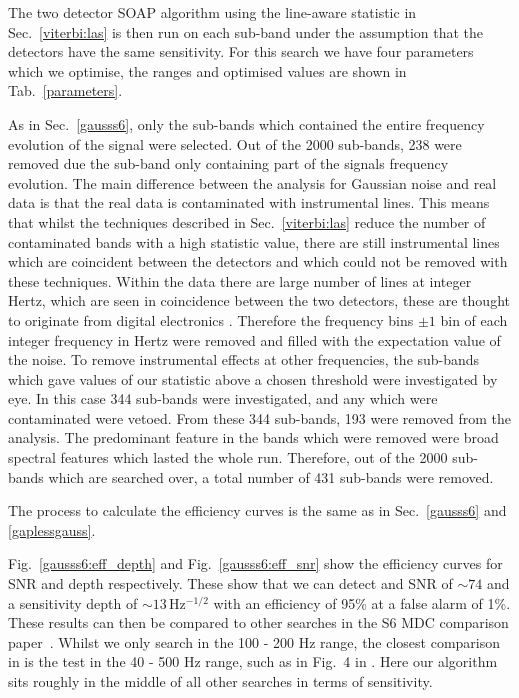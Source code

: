 The two detector SOAP algorithm using the line-aware statistic in Sec.~\ref{viterbi:las} is then run on each sub-band under the assumption that the detectors have the same sensitivity.
For this search we have four parameters which we optimise, the ranges and optimised values are shown in Tab.~\ref{parameters}.

%
%
As in Sec.~\ref{gausss6}, only the sub-bands which contained the entire frequency evolution of the signal were selected.
Out of the 2000 sub-bands, 238 were removed due the sub-band only containing part of the signals frequency evolution.
The main difference between the analysis for Gaussian noise and real data is that
the real data is contaminated with instrumental lines. This means that whilst the techniques described in Sec.~\ref{viterbi:las} reduce the number of contaminated bands with a high statistic value, there are still
instrumental lines which are coincident between the detectors and which could not be removed
with these techniques. Within the data there are large number of lines at integer Hertz, which are seen in coincidence between the two detectors, these are thought to originate from digital electronics \citep{coughlin2010NoiseLine}. Therefore the frequency bins $\pm1$ bin of each integer frequency in
Hertz were removed and filled with the expectation value of the noise. To remove instrumental effects at other frequencies,
the sub-bands which gave values of our
statistic above a chosen threshold were investigated by eye. In this case 344 sub-bands were
investigated, and any which were contaminated were vetoed. 
From these 344 sub-bands, 193 were removed from the analysis. The predominant feature in the bands which were removed were broad spectral features which lasted the whole run. Therefore, out of the 2000 sub-bands which are searched over, a total number of 431 sub-bands were removed.

%
%
The process to calculate the efficiency curves is the same as
in Sec.~\ref{gausss6} and \ref{gaplessgauss}.

%
%

Fig.~\ref{gausss6:eff_depth} and Fig.~\ref{gausss6:eff_snr} show the efficiency curves
for \ac{SNR} and depth respectively.  These show that we can detect and
\ac{SNR} of $\sim 74$ and a sensitivity depth of $\sim 13$\,Hz$^{-1/2}$ with
an efficiency of 95\% at a false alarm of 1\%. These results can then be compared to other searches in the S6 MDC comparison paper~\citep{walsh2016ComparisonMethods}. Whilst we only search in the 100 - 200 Hz range, the closest comparison in \citep{walsh2016ComparisonMethods} is the test in the 40 - 500 Hz range, such as in Fig.~4 in \citep{walsh2016ComparisonMethods}. Here our algorithm sits roughly in the middle of all other searches in terms of sensitivity.

